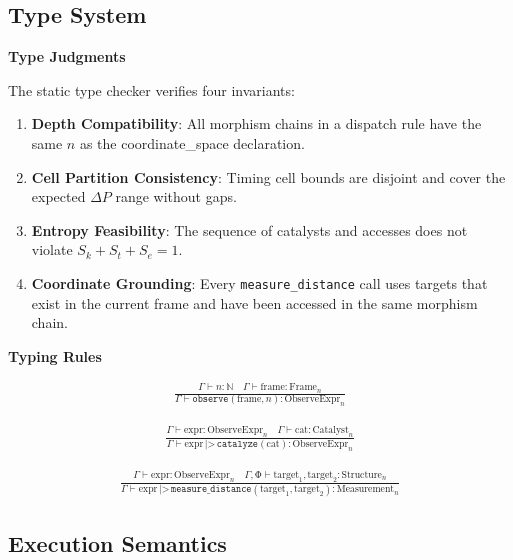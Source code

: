 \documentclass[11pt,twocolumn]{article}
\begin{document}
\subsection{Type System}

\textbf{Type Judgments}

The static type checker verifies four invariants:

\begin{enumerate}
\item \textbf{Depth Compatibility}: All morphism chains in a dispatch rule have the same $n$ as the coordinate\_space declaration.
\item \textbf{Cell Partition Consistency}: Timing cell bounds are disjoint and cover the expected $\Delta P$ range without gaps.
\item \textbf{Entropy Feasibility}: The sequence of catalysts and accesses does not violate $S_k + S_t + S_e = 1$.
\item \textbf{Coordinate Grounding}: Every \texttt{measure\_distance} call uses targets that exist in the current frame and have been accessed in the same morphism chain.
\end{enumerate}

\textbf{Typing Rules}

\begin{align}
\frac{\Gamma \vdash n : \mathbb{N} \quad \Gamma \vdash \text{frame} : \text{Frame}_n}
{\Gamma \vdash \texttt{observe}(\text{frame}, n) : \text{ObserveExpr}_n}
\end{align}

\begin{align}
\frac{\Gamma \vdash \text{expr} : \text{ObserveExpr}_n \quad \Gamma \vdash \text{cat} : \text{Catalyst}_n}
{\Gamma \vdash \text{expr} \,|\text{>}\, \texttt{catalyze}(\text{cat}) : \text{ObserveExpr}_n}
\end{align}

\begin{align}
\frac{\Gamma \vdash \text{expr} : \text{ObserveExpr}_n \quad \Gamma, \text{Φ} \vdash \text{target}_1, \text{target}_2 : \text{Structure}_n}
{\Gamma \vdash \text{expr} \,|\text{>}\, \texttt{measure\_distance}(\text{target}_1, \text{target}_2) : \text{Measurement}_n}
\end{align}

\subsection{Execution Semantics}
\end{document}
